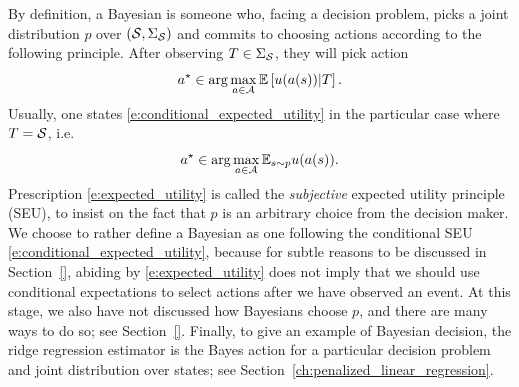 By definition, a Bayesian is someone who, facing a decision problem, picks a joint distribution $p$ over $(\mathcal{S}, \Sigma_{\mathcal{S}})$ and commits to choosing actions according to the following principle.
After observing $T\in\Sigma_{\mathcal{S}}$, they will pick action
\begin{equation}
    a^\star \in \arg\max_{a\in\mathcal{A}} \mathbb{E} \left [ u(a(s)) | T \right ].
    \label{e:conditional_expected_utility}
\end{equation}
Usually, one states \eqref{e:conditional_expected_utility} in the particular case where $T=\mathcal{S}$, i.e.
\begin{equation}
    a^\star \in \arg\max_{a\in\mathcal{A}} \mathbb{E}_{s\sim p} u(a(s)).
    \label{e:expected_utility}
\end{equation}
Prescription \eqref{e:expected_utility} is called the \emph{subjective} expected utility principle (SEU),
to insist on the fact that $p$ is an arbitrary choice from the decision maker.
We choose to rather define a Bayesian as one following the conditional SEU \eqref{e:conditional_expected_utility}, because for subtle reasons to be discussed in Section~\ref{}, abiding by \eqref{e:expected_utility} does not imply that we should use conditional expectations to select actions after we have observed an event. 
At this stage, we also have not discussed how Bayesians choose $p$, and there are many ways to do so; see Section~\ref{}.
Finally, to give an example of Bayesian decision, the ridge regression estimator is the Bayes action for a particular decision problem and joint distribution over states; see Section~\ref{ch:penalized_linear_regression}.

